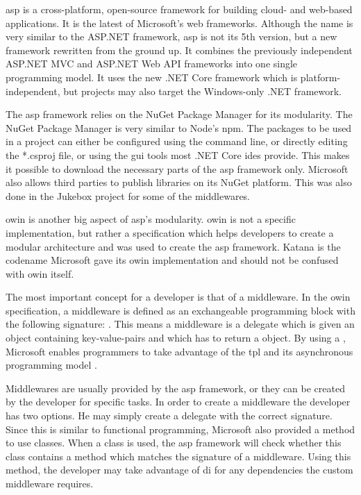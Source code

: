

\gls{asp} is a cross-platform, open-source framework for building cloud- and web-based applications. It is the latest of Microsoft's web frameworks. Although the name is very similar to the ASP.NET framework, \gls{asp} is not its 5th version, but a new framework rewritten from the ground up. It combines the previously independent ASP.NET MVC and ASP.NET Web API frameworks into one single programming model. It uses the new .NET Core framework which is platform-independent, but projects may also target the Windows-only .NET framework. \cite{introASP}


The \gls{asp} framework relies on the NuGet Package Manager for its modularity. The NuGet Package Manager is very similar to Node's \gls{npm}. The packages to be used in a project can either be configured using the command line, or directly editing the *.csproj file, or using the \gls{gui} tools most .NET Core \gls{ide}s provide. This makes it possible to download the necessary parts of the \gls{asp} framework only. Microsoft also allows third parties to publish libraries on its NuGet platform. This was also done in the Jukebox project for some of the middlewares.


\gls{owin} is another big aspect of \gls{asp}'s modularity. \gls{owin} is not a specific implementation, but rather a specification which helps developers to create a modular architecture and was used to create the \gls{asp} framework. Katana is the codename Microsoft gave its \gls{owin} implementation and should not be confused with \gls{owin} itself.

The most important concept for a developer is that of a middleware. In the \gls{owin} specification, a middleware is defined as an exchangeable programming block with the following signature: . This means a middleware is a delegate which is given an  object containing key-value-pairs and which has to return a  object. By using a , Microsoft enables programmers to take advantage of the \gls{tpl} and its asynchronous programming model \cite{tpl}.

Middlewares are usually provided by the \gls{asp} framework, or they can be created by the developer for specific tasks. In order to create a middleware the developer has two options. He may simply create a delegate with the correct signature. Since this is similar to functional programming, Microsoft also provided a method to use classes. When a class is used, the \gls{asp} framework will check whether this class contains a method which matches the signature of a middleware. Using this method, the developer may take advantage of \gls{di} for any dependencies the custom middleware requires. \cite{owinKatana}

